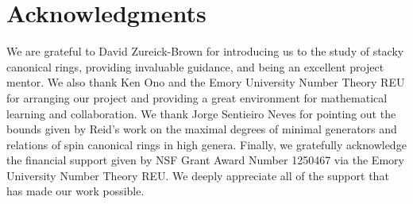 \documentclass{amsart}
\theoremstyle{plain}
\theoremstyle{definition}
\theoremstyle{remark}
\numberwithin{equation}{section}
\begin{document}

\section{Acknowledgments}
We are grateful to David Zureick-Brown for introducing us to the study of stacky canonical rings, providing invaluable guidance, and being  an
excellent project mentor. We also thank Ken Ono and the Emory 
University Number Theory REU for arranging our project and 
providing a great environment for mathematical learning and 
collaboration.  We thank Jorge Sentieiro Neves for pointing out the
bounds given by Reid's work on the maximal degrees of minimal
generators and relations of spin canonical rings in high genera.
Finally, we gratefully acknowledge the financial support given by NSF Grant Award Number 1250467 via the
Emory University Number Theory REU. 
We deeply appreciate all of the
support that has made our work possible.


\nocite{*}
{}

\end{document}
